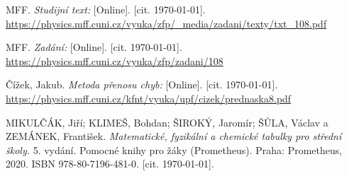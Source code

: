 
\begin{thebibliography}{9}
 MFF. \emph{Studijní text:} [Online]. [cit. \today]. \newline \url{https://physics.mff.cuni.cz/vyuka/zfp/_media/zadani/texty/txt_108.pdf}

 MFF. \emph{Zadání:} [Online]. [cit. \today]. \newline \url{https://physics.mff.cuni.cz/vyuka/zfp/zadani/108}

 Čížek, Jakub. \emph{Metoda přenosu chyb:} [Online]. [cit. \today]. \newline \url{https://physics.mff.cuni.cz/kfnt/vyuka/upf/cizek/prednaska8.pdf}

 MIKULČÁK, Jiří; KLIMEŠ, Bohdan; ŠIROKÝ, Jaromír; ŠŮLA, Václav a ZEMÁNEK, František. \emph{Matematické, fyzikální a chemické tabulky pro střední školy.} 5. vydání. Pomocné knihy pro žáky (Prometheus). Praha: Prometheus, 2020. ISBN 978-80-7196-481-0. [cit. \today].

\end{thebibliography}
